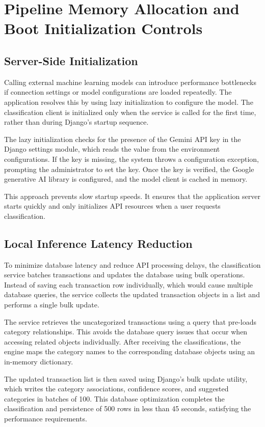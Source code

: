 \section{Pipeline Memory Allocation and Boot Initialization Controls}
\subsection{Server-Side Initialization}
Calling external machine learning models can introduce performance bottlenecks if connection settings or model configurations are loaded repeatedly. The application resolves this by using lazy initialization to configure the model. The classification client is initialized only when the service is called for the first time, rather than during Django's startup sequence.

The lazy initialization checks for the presence of the Gemini API key in the Django settings module, which reads the value from the environment configurations. If the key is missing, the system throws a configuration exception, prompting the administrator to set the key. Once the key is verified, the Google generative AI library is configured, and the model client is cached in memory.

This approach prevents slow startup speeds. It ensures that the application server starts quickly and only initializes API resources when a user requests classification.

\subsection{Local Inference Latency Reduction}
To minimize database latency and reduce API processing delays, the classification service batches transactions and updates the database using bulk operations. Instead of saving each transaction row individually, which would cause multiple database queries, the service collects the updated transaction objects in a list and performs a single bulk update.

The service retrieves the uncategorized transactions using a query that pre-loads category relationships. This avoids the database query issues that occur when accessing related objects individually. After receiving the classifications, the engine maps the category names to the corresponding database objects using an in-memory dictionary.

The updated transaction list is then saved using Django's bulk update utility, which writes the category associations, confidence scores, and suggested categories in batches of 100. This database optimization completes the classification and persistence of 500 rows in less than 45 seconds, satisfying the performance requirements.


